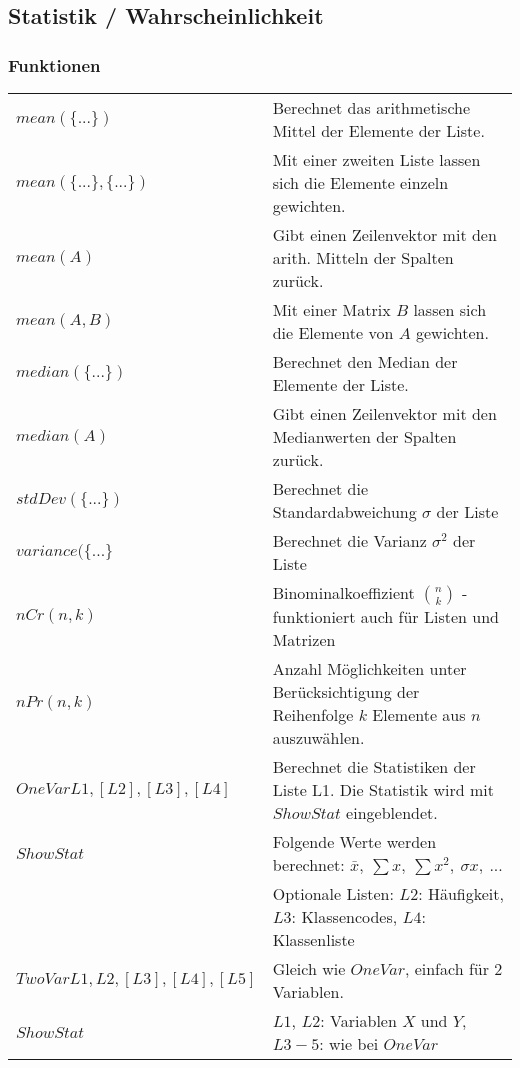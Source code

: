 \subsection{Statistik / Wahrscheinlichkeit}

\subsubsection{Funktionen}
\begin{tabular}{|l|l|}
	\hline
	$mean(\{...\})$				& Berechnet das arithmetische Mittel der Elemente der Liste. \\
	$mean(\{...\},\{...\})$		& Mit einer zweiten Liste lassen sich die Elemente einzeln gewichten. \\ \hline
	$mean(A)$					& Gibt einen Zeilenvektor mit den arith. Mitteln der Spalten zurück. \\ 
	$mean(A,B)$					& Mit einer Matrix $B$ lassen sich die Elemente von $A$ gewichten. \\ \hline
	$median(\{...\})$			& Berechnet den Median der Elemente der Liste. \\
	$median(A)$					& Gibt einen Zeilenvektor mit den Medianwerten der Spalten zurück. \\ \hline
	$stdDev(\{...\})$			& Berechnet die Standardabweichung $\sigma$ der Liste \\ \hline
	$variance(\{...\}$			& Berechnet die Varianz $\sigma ^2$ der Liste \\ \hline
	$nCr(n,k)$					& Binominalkoeffizient $\binom{n}{k}$ - funktioniert auch für Listen und Matrizen	\\ \hline
	$nPr(n,k)$					& Anzahl Möglichkeiten unter Berücksichtigung der Reihenfolge $k$ Elemente aus $n$ auszuwählen. \\ \hline
	$OneVar L1,[L2],[L3],[L4]$	& Berechnet die Statistiken der Liste L1. Die Statistik wird mit $ShowStat$ eingeblendet. \\
	$ShowStat$					& Folgende Werte werden berechnet: $ \bar x, \: \sum x, \: \sum x^2, \: \sigma x, \: ...$ \\
								& Optionale Listen: $L2$: Häufigkeit, $L3$: Klassencodes, $L4$: Klassenliste \\ \hline
	$TwoVar L1,L2,[L3],[L4],[L5]$ & Gleich wie $OneVar$, einfach für 2 Variablen. \\
	$ShowStat$ & $L1$, $L2$: Variablen $X$ und $Y$, $L3-5$: wie bei $OneVar$ \\ \hline
\end{tabular}

